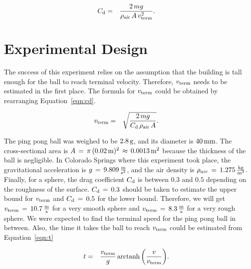\documentclass{article}
\begin{document}
\begin{eqnarray}
C_{\textnormal{d}}&=&\frac{2\,mg}{\rho_{\textnormal{air}}\,A\,v_{\textnormal{term}}^{2}}. \label{eqn:cd}
\end{eqnarray}

\section{Experimental Design}

\noindent The success of this experiment relies on the assumption that the building is tall enough for the ball to reach terminal velocity. Therefore, $v_{\textnormal{term}}$ needs to be estimated in the first place. The formula for $v_{\textnormal{term}}$ could be obtained by rearranging Equation~\ref{eqn:cd}. 

\begin{eqnarray}
v_{\textnormal{term}}&=&\sqrt{\frac{2\,mg}{C_{\textnormal{d}}\,\rho_{\textnormal{air}}\,A}}. \label{eqn:vterm}
\end{eqnarray}

\noindent The ping pong ball was weighed to be $2.8\,\textnormal{g}$, and its diameter is $40\,\textnormal{mm}$. The cross-sectional area is $A\,=\,\pi\,(0.02\,\textnormal{m})^{2}\,\approx\,0.0013\,\textnormal{m}^{2}$ because the thickness of the ball is negligible. In Colorado Springs where this experiment took place, the gravitational acceleration is $g\,=\,9.809\,\frac{\textnormal{m}}{\textnormal{s}^{2}}$, and the air density is $\rho_{air}\,=\,1.275\,\frac{\textnormal{kg}}{\textnormal{m}^{3}}$. Finally, for a sphere, the drag coefficient $C_{\textnormal{d}}$ is between $0.3$ and $0.5$ depending on the roughness of the surface. $C_{\textnormal{d}}\,=\,0.3$ should be taken to estimate the upper bound for $v_{\textnormal{term}}$ and $C_{\textnormal{d}}\,=\,0.5$ for the lower bound. Therefore, we will get $v_{\textnormal{term}}\,=\,10.7\,\frac{\textnormal{m}}{\textnormal{s}}$ for a very smooth sphere and $v_{\textnormal{term}}\,=\,8.3\,\frac{\textnormal{m}}{\textnormal{s}}$ for a very rough sphere. We were expected to find the terminal speed for the ping pong ball in between. Also, the time it takes the ball to reach $v_{\textnormal{term}}$ could be estimated from Equation~\ref{eqn:t}

\begin{eqnarray}
t&=&\frac{v_{\textnormal{term}}}{g}\,\textnormal{arctanh}\,\bigg(\frac{v}{v_{\textnormal{term}}}\bigg).
\label{eqn:t}
\end{eqnarray}
\end{document}
